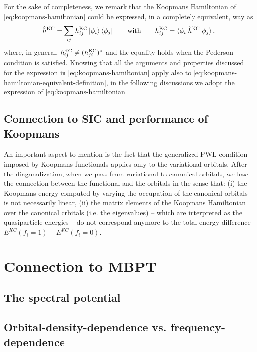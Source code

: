 For the sake of completeness, we remark that the Koopmans Hamiltonian of \cref{eq:koopmans-hamiltonian} could be expressed, in a completely equivalent, way as
%
\begin{equation}
    \hat{h}^{\rm KC} = \sum_{ij} h^{\rm KC}_{ij} \ket{\phi_i} \bra{\phi_j}
    \qquad \text{with} \qquad
    h^{\rm KC}_{ij} = \braket{\phi_i | \hat{h}^{\rm KC} | \phi_j} ,
    \label{eq:koopmans-hamiltonian-equivalent-definition}
\end{equation}
%
where, in general, $h^{\rm KC}_{ij} \neq (h^{\rm KC}_{ji})^*$ and the equality holds when the Pederson condition is satisfied. Knowing that all the arguments and properties discussed for the expression in \eqref{eq:koopmans-hamiltonian} apply also to \cref{eq:koopmans-hamiltonian-equivalent-definition}, in the following discussions we adopt the expression of \cref{eq:koopmans-hamiltonian}.

\subsection{Connection to SIC and performance of Koopmans}
An important aspect to mention is the fact that the generalized PWL condition imposed by Koopmans functionals applies only to the variational orbitals. After the diagonalization, when we pass from variational to canonical orbitals, we lose the connection between the functional and the orbitals in the sense that: (i) the Koopmans energy computed by varying the occupation of the canonical orbitals is not necessarily linear, (ii) the matrix elements of the Koopmans Hamiltonian over the canonical orbitals (i.e. the eigenvalues) -- which are interpreted as the quasiparticle energies -- do not correspond anymore to the total energy difference $E^{KC}(f_i=1)-E^{KC}(f_i=0)$.

\section{Connection to MBPT\label{sec:koopmans-vs-mbpt}}

\subsection{The spectral potential\label{sec:spectral-potential}}

\subsection{Orbital-density-dependence vs. frequency-dependence\label{sec:odd-vs-omega-dependence}}

